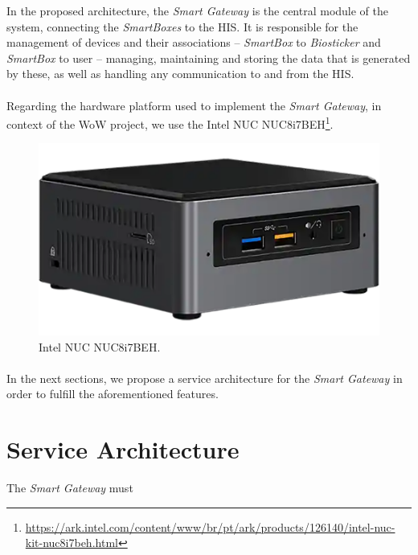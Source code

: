 

In the proposed architecture, the \textit{Smart Gateway} is the central module of the system, connecting the \textit{SmartBoxes} to the \acs{HIS}. It is responsible for the management of devices and their associations -- \textit{SmartBox} to \textit{Biosticker} and \textit{SmartBox} to user -- managing, maintaining and storing the data that is generated by these, as well as handling any communication to and from the \acs{HIS}. 


\paragraph{} Regarding the hardware platform used to implement the \textit{Smart Gateway}, in context of the \acs{WoW} project, we use the Intel NUC NUC8i7BEH\footnote{\url{https://ark.intel.com/content/www/br/pt/ark/products/126140/intel-nuc-kit-nuc8i7beh.html}}.

\begin{figure}[H]
    \centering
    \includegraphics[width=0.5\linewidth]{images/gateway-image.png}
    \caption[Intel NUC NUC8i7BEH.]{Intel NUC NUC8i7BEH.}
    \label{fig:gateway_image}
\end{figure}


\paragraph{} In the next sections, we propose a service architecture for the \textit{Smart Gateway} in order to fulfill the aforementioned features.



\section{Service Architecture}

The \textit{Smart Gateway} must 

